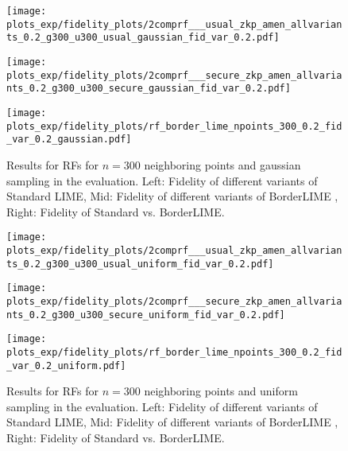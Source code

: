 \begin{figure*}[hbt!]
    \centering
    \begin{minipage}{0.35\linewidth}
        \centering
        \texttt{[image: plots\_exp/fidelity\_plots/2comprf\_\_\_usual\_zkp\_amen\_allvariants\_0.2\_g300\_u300\_usual\_gaussian\_fid\_var\_0.2.pdf]}
        \label{fig:simpvsorig_rf}
    \end{minipage}\hfill
    \begin{minipage}{0.35\linewidth}
        \centering
        \texttt{[image: plots\_exp/fidelity\_plots/2comprf\_\_\_secure\_zkp\_amen\_allvariants\_0.2\_g300\_u300\_secure\_gaussian\_fid\_var\_0.2.pdf]}
        \label{fig:border_2comp_all_rf}
    \end{minipage}\hfill
    \begin{minipage}{0.29\linewidth}
        \centering
        \texttt{[image: plots\_exp/fidelity\_plots/rf\_border\_lime\_npoints\_300\_0.2\_fid\_var\_0.2\_gaussian.pdf]}
        \label{fig:borderlimevsnormal_rf_300}
    \end{minipage}\hfill
    \caption{Results for RFs for $n=300$ neighboring points and gaussian sampling in the evaluation. Left: Fidelity of different variants of Standard LIME, Mid: Fidelity of different variants of BorderLIME , Right: Fidelity of Standard vs. BorderLIME.}
    \label{fig:fidelity_plots_all_rf}
\end{figure*}

\begin{figure*}[hbt!]
    \centering
    \begin{minipage}{0.35\linewidth}
        \centering
        \texttt{[image: plots\_exp/fidelity\_plots/2comprf\_\_\_usual\_zkp\_amen\_allvariants\_0.2\_g300\_u300\_usual\_uniform\_fid\_var\_0.2.pdf]}
        \label{fig:simpvsorig_rf_unif}
    \end{minipage}\hfill
    \begin{minipage}{0.35\linewidth}
        \centering
        \texttt{[image: plots\_exp/fidelity\_plots/2comprf\_\_\_secure\_zkp\_amen\_allvariants\_0.2\_g300\_u300\_secure\_uniform\_fid\_var\_0.2.pdf]}
        \label{fig:border_2comp_all_rf_unif}
    \end{minipage}\hfill
    \begin{minipage}{0.29\linewidth}
        \centering
        \texttt{[image: plots\_exp/fidelity\_plots/rf\_border\_lime\_npoints\_300\_0.2\_fid\_var\_0.2\_uniform.pdf]}
        \label{fig:borderlimevsnormal_rf_300_unif}
    \end{minipage}\hfill
    \caption{Results for RFs for $n=300$ neighboring points and uniform sampling in the evaluation. Left: Fidelity of different variants of Standard LIME, Mid: Fidelity of different variants of BorderLIME , Right: Fidelity of Standard vs. BorderLIME.}
    \label{fig:fidelity_plots_all_rf_unif}
\end{figure*}

